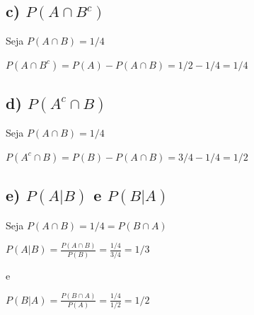 \documentclass[12pt]{article}
\begin{document}
\subsection*{c) $P(A \cap B^c)$}

Seja $P(A \cap B) = 1/4$

$P(A \cap B^c) = P(A)-P(A \cap B) = 1/2-1/4=1/4$

\subsection*{d) $P(A^c \cap B)$}

Seja $P(A \cap B) = 1/4$

$P(A^c \cap B) = P(B)-P(A \cap B) = 3/4-1/4=1/2$

\subsection*{e) $P(A | B)$ e $P(B | A)$}

Seja $P(A \cap B) = 1/4 = P(B \cap A)$

$\displaystyle P(A | B) = \frac{P(A \cap B)}{P(B)}=\frac{1/4}{3/4}=1/3$

e

$\displaystyle P(B | A) = \frac{P(B \cap A)}{P(A)}=\frac{1/4}{1/2}=1/2$










\end{document}
